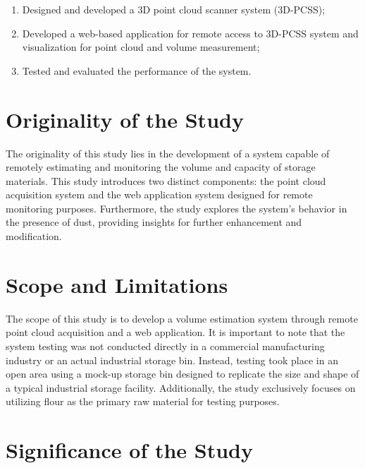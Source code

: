 \begin{enumerate}
	\item Designed and developed a 3D point cloud scanner system (3D-PCSS);
	\item Developed a web-based application for remote access to 3D-PCSS system and visualization for point cloud and volume measurement;
	\item Tested and evaluated the performance of the system.
\end{enumerate}

\section{Originality of the Study}
\label{intro:sec:Originality of the Study}
The originality of this study lies in the development of a system capable of remotely estimating and monitoring the volume and capacity of storage materials. This study introduces two distinct components: the point cloud acquisition system and the web application system designed for remote monitoring purposes. Furthermore, the study explores the system's behavior in the presence of dust, providing insights for further enhancement and modification.

\section{Scope and Limitations}
\label{intro:sec:Scope and Limitations}
The scope of this study is to develop a volume estimation system through remote point cloud acquisition and a web application. It is important to note that the system testing was not conducted directly in a commercial manufacturing industry or an actual industrial storage bin. Instead, testing took place in an open area using a mock-up storage bin designed to replicate the size and shape of a typical industrial storage facility. Additionally, the study exclusively focuses on utilizing flour as the primary raw material for testing purposes.


\section{Significance of the Study}
\label{intro:sec:Significance of the Study}


